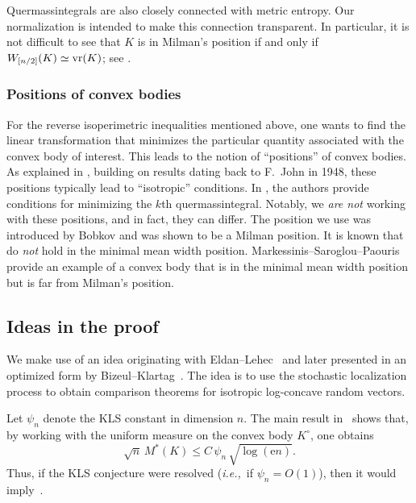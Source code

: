 \documentclass[11pt]{amsart}
\newcommand{\1}{\mathbf 1}
\newcommand{\e}{\mathrm{e}}
\newcommand{\ie}{\emph{i.e.,}}
\theoremstyle{plain}
\begin{document}
Quermassintegrals are also closely connected with metric entropy. Our normalization is intended to make this connection transparent. In particular, it is not difficult to see that $K$ is in Milman's position if and only if
$
W_{[ n/2]}(K)\simeq {\rm vr}(K)
$; see \cite[Chapter 8]{ArtAviGiaMil15}.
  
\subsubsection{Positions of convex bodies}
\label{sec:positions}
For the reverse isoperimetric inequalities mentioned above, one wants to find the linear transformation that minimizes the particular quantity associated with the convex body of interest. This leads to the notion of ``positions'' of convex bodies. As explained in \cite{GiaMil00}, building on results dating back to F.\ John in 1948, these positions typically lead to ``isotropic'' conditions. In \cite{GiaMil00}, the authors provide conditions for minimizing the $k$th quermassintegral. Notably, we \emph{are not} working with these positions, and in fact, they can differ. The position we use was introduced by Bobkov \cite{Bob11} and was shown to be a Milman position. It is known that~ do \emph{not} hold in the minimal mean width position. Markessinis--Saroglou--Paouris \cite{MarPaoSar12} provide an example of a convex body that is in the minimal mean width position but is far from Milman's position.

\subsection{Ideas in the proof}

We make use of an idea originating with Eldan--Lehec~\cite{EldLeh14} and later presented in an optimized form by Bizeul--Klartag~\cite{BizKla26}. The idea is to use the stochastic localization process to obtain comparison theorems for isotropic log-concave random vectors.

Let $\psi_n$ denote the KLS constant in dimension $n$. The main result in~\cite{BizKla26} shows that, by working with the uniform measure on the convex body $K^\circ$, one obtains
\begin{equation}
\label{ineq:comparison-via-KLS}
\sqrt{n} \, M^\ast(K) \leq C \, \psi_n \, \sqrt{\log (\e n)}.
\end{equation}
Thus, if the KLS conjecture were resolved (\ie~if $\psi_n = O(1)$), then it would imply~.
\end{document}
